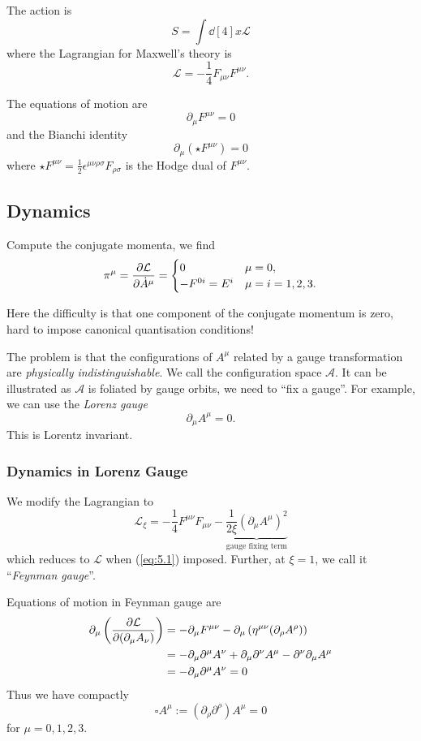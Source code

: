\documentclass[a4paper,11pt]{article}
\begin{document}
	The action is 
	\[
		S = \int \dd[4]{x} \mathcal{L}
	\]
	where the Lagrangian for Maxwell's theory is
	\[
		\mathcal{L} = - \frac{1}{4} F _{\mu \nu} F ^{\mu \nu}.
	\]
	
	The equations of motion are
	\[
		\partial_\mu F ^{\mu \nu} = 0
	\]
	and the Bianchi identity
	\[
		\partial_\mu (\star F ^{\mu \nu}) = 0
	\]
	where $\star F ^{\mu \nu} = \frac{1}{2} \epsilon ^{\mu \nu \rho \sigma} F _{\rho \sigma}$ is the Hodge dual of $F ^{\mu \nu}$.

	\subsection{Dynamics}
	Compute the conjugate momenta, we find
	\[
		\pi^\mu = \pdv{\mathcal{L}}{\dot A^\mu} = \begin{cases}
			0 & \mu = 0,\\
			- F ^{0i} = E ^{i} & \mu = i = 1,2,3.
		\end{cases}
	\]

	Here the difficulty is that one component of the conjugate momentum is zero, hard to impose canonical quantisation conditions!

	The problem is that the configurations of $A ^\mu$ related by a gauge transformation are \emph{physically indistinguishable}. We call the configuration space $\mathcal{A}$. It can be illustrated as  $\mathcal{A}$ is foliated by gauge orbits, we need to ``fix a gauge''. For example, we can use the \emph{Lorenz gauge}
	\begin{equation}
		\partial_\mu A^\mu = 0.
		\label{eq:5.1}
	\end{equation}
	This is Lorentz invariant.

	\subsubsection{Dynamics in Lorenz Gauge}
	We modify the Lagrangian to 
	\[
		\mathcal{L}_\xi = - \frac{1}{4} F ^{\mu \nu} F _{\mu \nu} - \underbrace{\frac{1}{2 \xi} \left( \partial_\mu A^\mu \right)^2}_{\text{gauge fixing term}}
	\]
	which reduces to $\mathcal{L}$ when (\ref{eq:5.1}) imposed. Further, at $\xi = 1$, we call it ``\emph{Feynman gauge}''.

	Equations of motion in Feynman gauge are 
	\begin{align*}
		\partial_\mu \left( \pdv{\mathcal{L}}{(\partial_\mu A_\nu)} \right) &= - \partial_\mu F ^{\mu \nu}
		- \partial_\mu \left( \eta ^{\mu \nu} (\partial_\rho A^\rho) \right)\\
		 & = - \partial_\mu \partial^\mu A^\nu + \partial_\mu \partial^\nu A^\mu - \partial^\nu \partial_\mu A^\mu\\
		 & = - \partial_\mu \partial^\mu A^\nu = 0
	\end{align*}
	Thus we have compactly 
	\[
		\square A^\mu := (\partial_\rho \partial^\rho) A^\mu = 0
	\]
	for $\mu = 0,1,2,3$.
\end{document}
